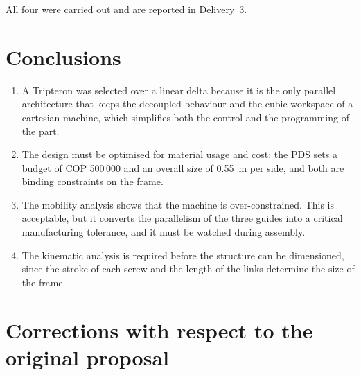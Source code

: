 \documentclass[11pt]{article}
\begin{document}
All four were carried out and are reported in Delivery~3.

\section{Conclusions}

\begin{enumerate}[leftmargin=*]
  \item A Tripteron was selected over a linear delta because it is the only parallel
        architecture that keeps the decoupled behaviour and the cubic workspace of a
        cartesian machine, which simplifies both the control and the programming of the
        part.
  \item The design must be optimised for material usage and cost: the PDS sets a budget of
        COP 500\,000 and an overall size of \SI{0.55}{\metre} per side, and both are
        binding constraints on the frame.
  \item The mobility analysis shows that the machine is over-constrained. This is
        acceptable, but it converts the parallelism of the three guides into a critical
        manufacturing tolerance, and it must be watched during assembly.
  \item The kinematic analysis is required before the structure can be dimensioned, since
        the stroke of each screw and the length of the links determine the size of the
        frame.
\end{enumerate}

\section{Corrections with respect to the original proposal}\label{sec:corrections}
\end{document}
